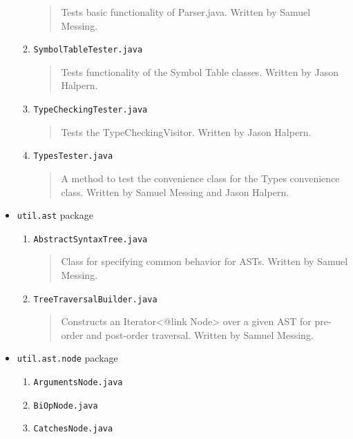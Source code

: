 \documentclass{report}
\begin{document}
\begin{itemize}
\begin{enumerate}
\begin{quotation}
\noindent Tests basic functionality of Parser.java. Written by Samuel Messing.
\end{quotation}
\item \texttt{SymbolTableTester.java}
\begin{quotation}
\noindent Tests functionality of the Symbol Table classes. Written by Jason Halpern. 
\end{quotation}
\item \texttt{TypeCheckingTester.java}
\begin{quotation}
\noindent Tests the TypeCheckingVisitor. Written by Jason Halpern. 
\end{quotation}
\item \texttt{TypesTester.java}
\begin{quotation}
\noindent A method to test the convenience class for the Types convenience class. Written by Samuel Messing and Jason Halpern. 
\end{quotation}
\end{enumerate} %
\item \texttt{util.ast} package
\begin{enumerate}
\item \texttt{AbstractSyntaxTree.java}
\begin{quotation}
\noindent Class for specifying common behavior for ASTs. Written by Samuel Messing. 
\end{quotation}
\item \texttt{TreeTraversalBuilder.java}
\begin{quotation}
\noindent Constructs an Iterator<{@link Node}> over a given AST for pre-order and post-order traversal. Written by Samuel Messing. 
\end{quotation}
\end{enumerate} %
\item \texttt{util.ast.node} package
\begin{enumerate}
\item \texttt{ArgumentsNode.java}
\begin{quotation}
\noindent 
\end{quotation}
\item \texttt{BiOpNode.java}
\begin{quotation}
\noindent 
\end{quotation}
\item \texttt{CatchesNode.java}
\begin{quotation}
\noindent 

\end{quotation}
\end{enumerate}
\end{itemize}
\end{document}
